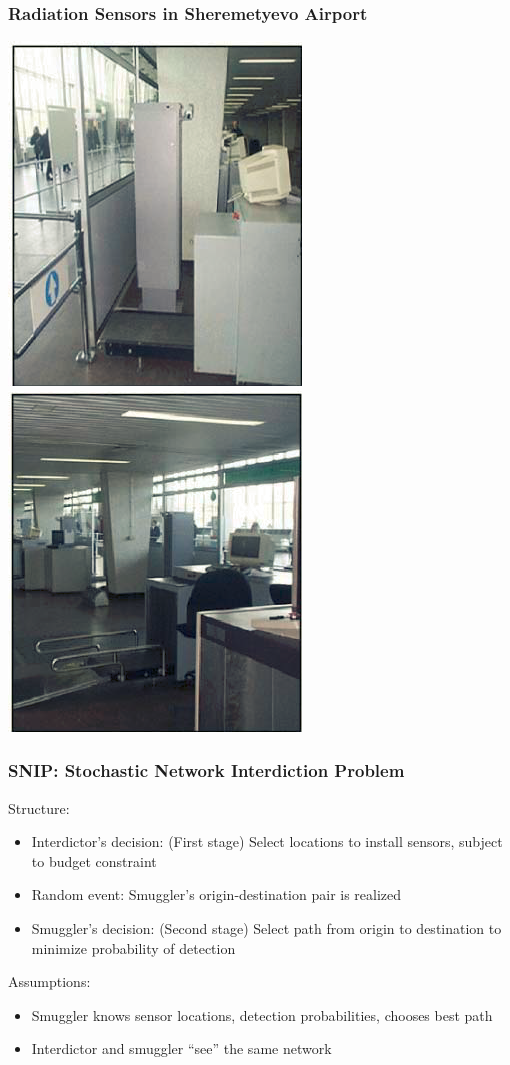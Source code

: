 \documentclass[12pt,handout]{beamer}
\begin{document}
\begin{frame}
\frametitle{Radiation Sensors in Sheremetyevo Airport}
\begin{center}
\includegraphics[scale=0.8]{detector1.png}
\includegraphics[scale=0.8]{detector2.png}
\end{center}
\end{frame}

\begin{frame}
\frametitle{SNIP: Stochastic Network Interdiction Problem}
Structure:
\begin{itemize}
\item Interdictor's decision: (First stage) Select locations to install sensors, subject to budget constraint
\item Random event: Smuggler's origin-destination pair is realized
\item Smuggler's decision: (Second stage) Select path from origin to destination to minimize probability of detection
\end{itemize}
Assumptions:
\begin{itemize}
\item Smuggler knows sensor locations, detection probabilities, chooses best path
\item Interdictor and smuggler ``see'' the same network
\end{itemize}
\end{frame}
\end{document}
